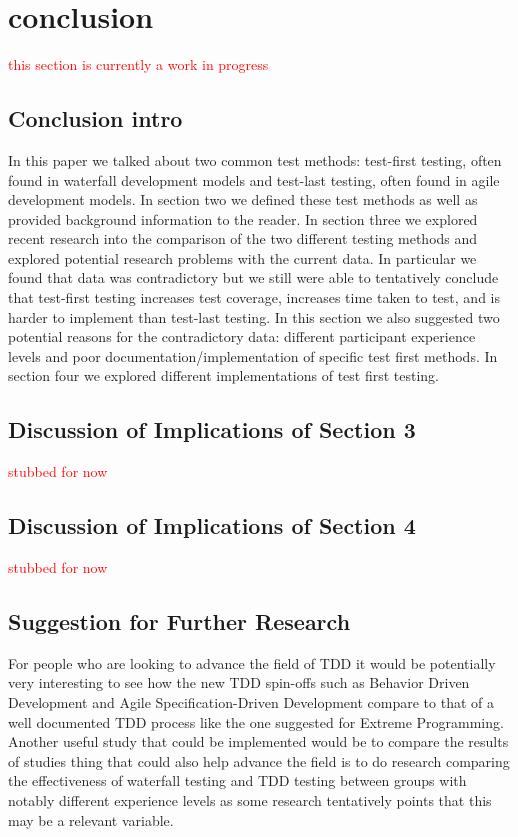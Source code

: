 \documentclass{sig-alternate}
\newcommand{\mycomment}[1]{\textcolor{red}{#1}}
\begin{document}
\section{conclusion}
\mycomment{this section is currently a work in progress}
\subsection{Conclusion intro}

In this paper we talked about two common test methods: test-first testing, often found in waterfall development models and test-last testing, often found in agile development models.  In section two we defined these test methods as well as provided background information to the reader.  In section three we explored recent research into the comparison of the two different testing methods and explored potential research problems with the current data.  In particular we found that data was contradictory but we still were able to tentatively conclude that test-first testing increases test coverage, increases time taken to test, and is harder to implement than test-last testing.  In this section we also suggested two potential reasons for the contradictory data: different participant experience levels and poor documentation/implementation of specific test first methods. In section four we explored different implementations of test first testing.  

\subsection{Discussion of Implications of Section 3}
\mycomment{stubbed for now}

\subsection{Discussion of Implications of Section 4}
\mycomment{stubbed for now}
\subsection{Suggestion for Further Research}
For people who are looking to advance the field of TDD it would be potentially very interesting to see how the new TDD spin-offs such as Behavior Driven Development and Agile Specification-Driven Development compare to that of a well documented TDD process like the one suggested for Extreme Programming.  Another useful study that could be implemented would be to compare the results of studies thing that could also help advance the field is to do research comparing the effectiveness of waterfall testing and TDD testing between groups with notably different experience levels as some research tentatively points that this may be a relevant variable.
\end{document}
